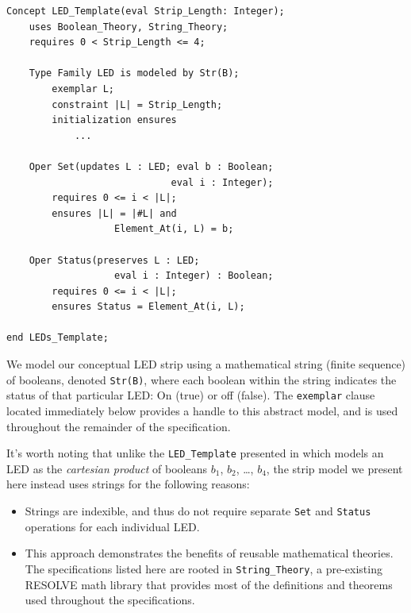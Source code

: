 \documentclass{sig-alternate}
\begin{document}
\begin{verbatim}
Concept LED_Template(eval Strip_Length: Integer);
    uses Boolean_Theory, String_Theory;
    requires 0 < Strip_Length <= 4;
	
    Type Family LED is modeled by Str(B);
        exemplar L;
        constraint |L| = Strip_Length;
        initialization ensures 
            ...
    
    Oper Set(updates L : LED; eval b : Boolean; 
                             eval i : Integer);
        requires 0 <= i < |L|;
        ensures |L| = |#L| and 
                   Element_At(i, L) = b;
    
    Oper Status(preserves L : LED; 
                   eval i : Integer) : Boolean;
        requires 0 <= i < |L|;
        ensures Status = Element_At(i, L);
        
end LEDs_Template;
\end{verbatim}

We model our conceptual LED strip using a mathematical string (finite sequence) of booleans, denoted \texttt{Str(B)}, where each boolean within the string indicates the status of that particular LED: On (true) or off (false). The \texttt{exemplar} clause located immediately below provides a handle to this abstract model, and is used throughout the remainder of the specification.


It's worth noting that unlike the \texttt{LED\_Template} presented in \cite{regula:2010} which models an LED as the \textit{cartesian product} of booleans $b_1$, $b_2$, \ldots , $b_4$, the strip model we present here instead uses strings for the following reasons:
\begin{itemize}
\item Strings are indexible, and thus do not require separate \texttt{Set} and \texttt{Status} operations for each individual LED.
\item This approach demonstrates the benefits of reusable mathematical theories. The specifications listed here are rooted in \texttt{String\_Theory}, a pre-existing RESOLVE math library that provides most of the definitions and theorems used throughout the specifications.
\end{itemize}
\end{document}
